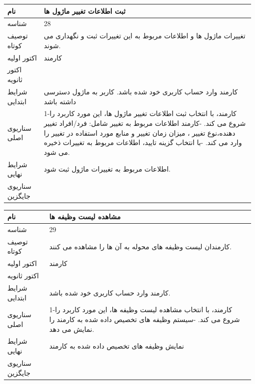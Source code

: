 \documentclass{article}
\begin{document}
\vspace{2cm}

\begin{tabular}{|p{2cm}|p{10cm}|}
\hline
نام
&
ثبت اطلاعات تغییر ماژول ها
\\
\hline
شناسه
&
28
\\
\hline
توصیف کوتاه  
&
تغییرات ماژول ها و اطلاعات مربوط به این تغییرات ثبت و نگهداری می شوند.
\\
\hline
اکتور اولیه
&
کارمند
\\
\hline
اکتور ثانویه
&

\\
\hline
شرایط ابتدایی
&
 کارمند وارد حساب کاربری خود شده باشد. 
 \newline
 کاربر به ماژول دسترسی داشته باشد

\\
\hline
سناریوی اصلی
&
1-کارمند، با انتخاب ثبت اطلاعات تغییر ماژول ها، این مورد کاربرد را شروع می کند.
\newline
2-کارمند اطلاعات مربوط به تغییر شامل: فرد/افراد تغییر دهنده،نوع تغییر ، میزان زمان تغییر و منابع مورد استفاده در تغییر را وارد می کند.
\newline
3-با انتخاب گزینه تایید، اطلاعات مربوط به تغییرات ذخیره می شود.
\\
\hline
شرایط نهایی
&
اطلاعات مربوط به تغییرات ماژول ثبت شود.
\\
\hline
سناریوی جایگزین
&

\\
\hline
\end{tabular}

\vspace{2cm}

\begin{tabular}{|p{2cm}|p{10cm}|}
\hline
نام
&
مشاهده لیست وظیفه ها
\\
\hline
شناسه
&
29
\\
\hline
توصیف کوتاه  
&
کارمندان لیست وظیفه های محوله به آن ها را مشاهده می کنند.
\\
\hline
اکتور اولیه
&
کارمند
\\
\hline
اکتور ثانویه
&

\\
\hline
شرایط ابتدایی
&
 کارمند وارد حساب کاربری خود شده باشد. 
\\
\hline
سناریوی اصلی
&
1-کارمند، با انتخاب مشاهده لیست وظیفه ها، این مورد کاربرد را شروع می کند.
\newline
2-سیستم وظیفه های تخصیص داده شده به کارمند را نمایش می دهد.
\\
\hline
شرایط نهایی
&
نمایش وظیفه های تخصیص داده شده به کارمند
\\
\hline
سناریوی جایگزین
&

\\
\hline
\end{tabular}
\end{document}
